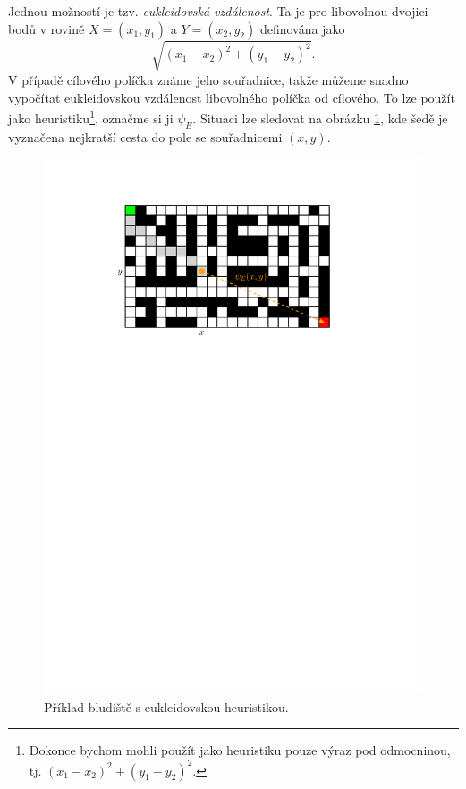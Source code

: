 Jednou možností je tzv. \emph{eukleidovská vzdálenost}. Ta je pro libovolnou dvojici bodů v rovině $X=(x_1,y_1)$ a $Y=(x_2,y_2)$ definována jako
\[\sqrt{(x_1-x_2)^2+(y_1-y_2)^2}.\]
V případě cílového políčka známe jeho souřadnice, takže můžeme snadno vypočítat eukleidovskou vzdálenost libovolného políčka od cílového. To lze použít jako heuristiku\footnote{Dokonce bychom mohli použít jako heuristiku pouze výraz pod odmocninou, tj. $(x_1-x_2)^2+(y_1-y_2)^2$.}, označme si ji $\psi_E$. Situaci lze sledovat na obrázku \ref{fig:astar_bludiste_euclid}, kde šedě je vyznačena nejkratší cesta do pole se souřadnicemi $(x,y)$.
\begin{figure}[h]
    \centering
    \includegraphics[scale=\graphimgsize]{components/images/ch01_astar_mrizka_euclid.pdf}
    \caption{Příklad bludiště s eukleidovskou heuristikou.}
    \label{fig:astar_bludiste_euclid}
\end{figure}
